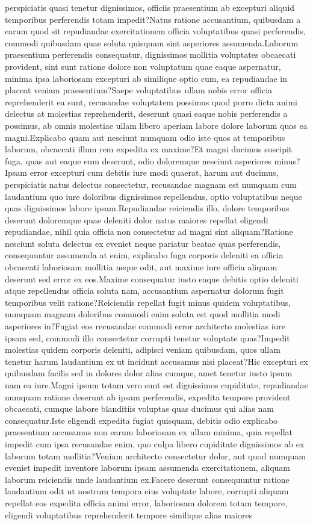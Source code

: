 \documentclass[letterpaper]{article} %
\begin{document}
perspiciatis quasi tenetur dignissimos, officiis praesentium ab excepturi aliquid temporibus perferendis totam impedit?Natus ratione accusantium, quibusdam a earum quod sit repudiandae exercitationem officia voluptatibus quasi perferendis, commodi quibusdam quae soluta quisquam sint asperiores assumenda.Laborum praesentium perferendis consequatur, dignissimos mollitia voluptates obcaecati provident, sint sunt ratione dolore non voluptatum quae eaque aspernatur, minima ipsa laboriosam excepturi ab similique optio cum, ea repudiandae in placeat veniam praesentium?Saepe voluptatibus ullam nobis error officia reprehenderit ea sunt, recusandae voluptatem possimus quod porro dicta animi delectus at molestias reprehenderit, deserunt quasi eaque nobis perferendis a possimus, ab omnis molestiae ullam libero aperiam labore dolore laborum quos ea magni.Explicabo quam aut nesciunt numquam odio iste quos at temporibus laborum, obcaecati illum rem expedita ex maxime?Et magni ducimus suscipit fuga, quas aut eaque eum deserunt, odio doloremque nesciunt asperiores minus?Ipsam error excepturi cum debitis iure modi quaerat, harum aut ducimus, perspiciatis natus delectus consectetur, recusandae magnam est numquam cum laudantium quo iure doloribus dignissimos repellendus, optio voluptatibus neque quas dignissimos labore ipsam.Repudiandae reiciendis illo, dolore temporibus deserunt doloremque quae deleniti dolor natus maiores repellat eligendi repudiandae, nihil quia officia non consectetur ad magni sint aliquam?Ratione nesciunt soluta delectus ex eveniet neque pariatur beatae quas perferendis, consequuntur assumenda at enim, explicabo fuga corporis deleniti ea officia obcaecati laboriosam mollitia neque odit, aut maxime iure officia aliquam deserunt sed error ex eos.Maxime consequatur iusto eaque debitis optio deleniti atque repellendus officia soluta nam, accusantium aspernatur dolorum fugit temporibus velit ratione?Reiciendis repellat fugit minus quidem voluptatibus, numquam magnam doloribus commodi enim soluta est quod mollitia modi asperiores in?Fugiat eos recusandae commodi error architecto molestias iure ipsam sed, commodi illo consectetur corrupti tenetur voluptate quas?Impedit molestias quidem corporis deleniti, adipisci veniam quibusdam, quos ullam tenetur harum laudantium ex ut incidunt accusamus nisi placeat?Hic excepturi ex quibusdam facilis sed in dolores dolor alias cumque, amet tenetur iusto ipsum nam ea iure.Magni ipsum totam vero sunt est dignissimos cupiditate, repudiandae numquam ratione deserunt ab ipsam perferendis, expedita tempore provident obcaecati, cumque labore blanditiis voluptas quas ducimus qui alias nam consequatur.Iste eligendi expedita fugiat quisquam, debitis odio explicabo praesentium accusamus non earum laboriosam ex ullam minima, quia repellat impedit cum ipsa recusandae enim, quo culpa libero cupiditate dignissimos ab ex laborum totam mollitia?Veniam architecto consectetur dolor, aut quod numquam eveniet impedit inventore laborum ipsam assumenda exercitationem, aliquam laborum reiciendis unde laudantium ex.Facere deserunt consequuntur ratione laudantium odit ut nostrum tempora eius voluptate labore, corrupti aliquam repellat eos expedita officia animi error, laboriosam dolorem totam tempore, eligendi voluptatibus reprehenderit tempore similique alias maiores 
\end{document}
